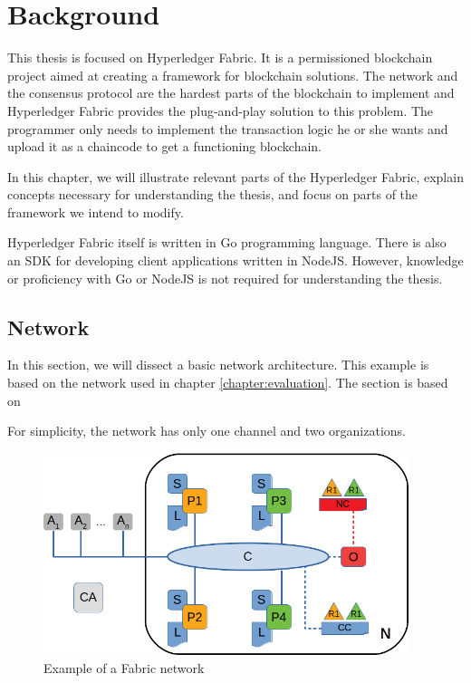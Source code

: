 \chapter{Background}
\label{chapter:background}

This thesis is focused on Hyperledger Fabric. It is a permissioned blockchain project aimed at creating a framework for blockchain solutions. The network and the consensus protocol are the hardest parts of the blockchain to implement and Hyperledger Fabric provides the plug-and-play solution to this problem. The programmer only needs to implement the transaction logic he or she wants and upload it as a chaincode to get a functioning blockchain.

In this chapter, we will illustrate relevant parts of the Hyperledger Fabric, explain concepts necessary for understanding the thesis, and focus on parts of the framework we intend to modify.

Hyperledger Fabric itself is written in Go programming language. There is also an SDK for developing client applications written in NodeJS.
However, knowledge or proficiency with Go or NodeJS is not required for understanding the thesis.

\section{Network}
\label{sec:network}

In this section, we will dissect a basic network architecture. This example is based on the network used in chapter \ref{chapter:evaluation}. The section is based on \cite{fabricdocs:network}

For simplicity, the network has only one channel and two organizations.

\vskip 0.5cm

\begin{figure}[hp]
\begin{center}
\includegraphics[width=0.95\textwidth]{figures/network}
\end{center}
\caption{Example of a Fabric network}
\label{fig:net}
\end{figure}

